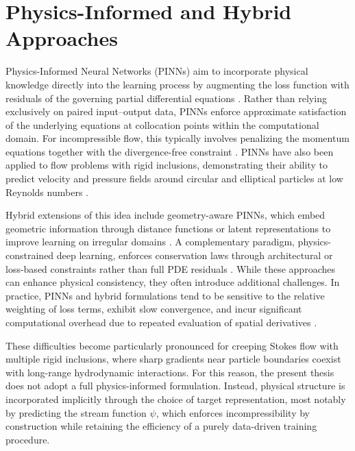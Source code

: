 \section{Physics-Informed and Hybrid Approaches}

Physics-Informed Neural Networks (PINNs) aim to incorporate physical knowledge directly into the learning process by augmenting the loss function with residuals of the governing partial differential equations \parencite{raissi_physics_2017,raissi_physics-informed_2019}. Rather than relying exclusively on paired input–output data, PINNs enforce approximate satisfaction of the underlying equations at collocation points within the computational domain. For incompressible flow, this typically involves penalizing the momentum equations together with the divergence-free constraint \parencite{jin_nsfnets_2021}. PINNs have also been applied to flow problems with rigid inclusions, demonstrating their ability to predict velocity and pressure fields around circular and elliptical particles at low Reynolds numbers \parencite{hu_applying_2023}.

Hybrid extensions of this idea include geometry-aware PINNs, which embed geometric information through distance functions or latent representations to improve learning on irregular domains \parencite{oldenburg_geometry_2022}. A complementary paradigm, physics-constrained deep learning, enforces conservation laws through architectural or loss-based constraints rather than full PDE residuals \parencite{zhu_physics-constrained_2019}. While these approaches can enhance physical consistency, they often introduce additional challenges. In practice, PINNs and hybrid formulations tend to be sensitive to the relative weighting of loss terms, exhibit slow convergence, and incur significant computational overhead due to repeated evaluation of spatial derivatives \parencite{li_physics-informed_2024}.

These difficulties become particularly pronounced for creeping Stokes flow with multiple rigid inclusions, where sharp gradients near particle boundaries coexist with long-range hydrodynamic interactions. For this reason, the present thesis does not adopt a full physics-informed formulation. Instead, physical structure is incorporated implicitly through the choice of target representation, most notably by predicting the stream function $\psi$, which enforces incompressibility by construction while retaining the efficiency of a purely data-driven training procedure.


